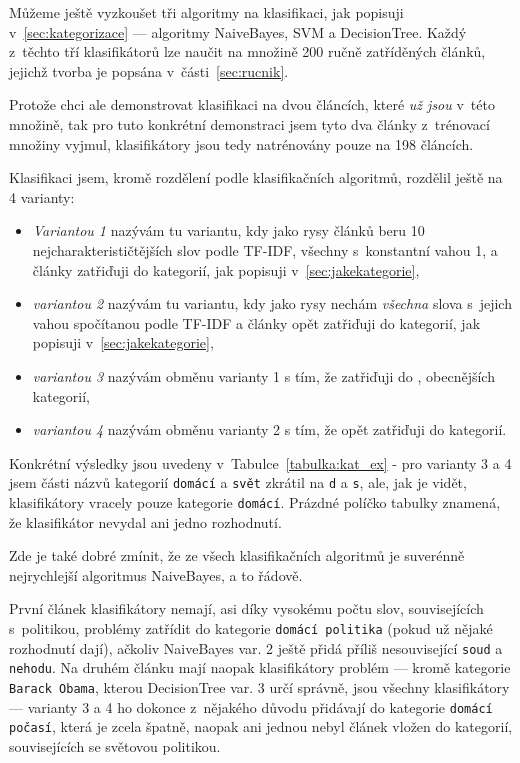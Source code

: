 \documentclass[12pt,a4paper]{report}
\begin{document}
%

Můžeme ještě vyzkoušet tři algoritmy na klasifikaci, jak popisuji v~\ref{sec:kategorizace} --- algoritmy NaiveBayes, SVM a DecisionTree. Každý z~těchto tří klasifikátorů lze naučit na množině 200 ručně zatříděných článků, jejichž tvorba je popsána v~části~\ref{sec:rucnik}.

Protože chci ale demonstrovat klasifikaci na dvou článcích, které \emph{už jsou} v~této množině, tak pro tuto konkrétní demonstraci jsem tyto dva články z~trénovací množiny vyjmul, klasifikátory jsou tedy natrénovány pouze na 198 článcích.

Klasifikaci jsem, kromě rozdělení podle klasifikačních algoritmů, rozdělil ještě na 4 varianty:

\begin{itemize}
    \item \emph{Variantou 1} nazývám tu variantu, kdy jako rysy článků beru 10 nej\-cha\-rak\-te\-ri\-sti\-čtěj\-ších slov podle TF-IDF, všechny s~konstantní vahou 1, a články zatřiďuji do  kategorií, jak popisuji v~\ref{sec:jakekategorie},
    \item \emph{variantou 2} nazývám tu variantu, kdy jako rysy nechám \emph{všechna} slova s~jejich vahou spočítanou podle TF-IDF  a články opět zatřiďuji do  kategorií, jak popisuji v~\ref{sec:jakekategorie},
    \item \emph{variantou 3} nazývám obměnu varianty 1 s tím, že zatřiďuji do , obecnějších kategorií,
    \item \emph{variantou 4} nazývám obměnu varianty 2 s tím, že opět zatřiďuji do  kategorií.
\end{itemize}


Konkrétní výsledky jsou uvedeny v~Tabulce~\ref{tabulka:kat_ex} - pro varianty 3 a 4 jsem části názvů kategorií \texttt{domácí} a \texttt{svět} zkrátil na \texttt{d} a \texttt{s}, ale, jak je vidět, klasifikátory vracely pouze kategorie \texttt{domácí}. Prázdné políčko tabulky znamená, že klasifikátor nevydal ani jedno rozhodnutí. 

Zde je také dobré zmínit, že ze všech klasifikačních algoritmů je suverénně nejrychlejší algoritmus NaiveBayes, a to řádově.

První článek klasifikátory nemají, asi díky vysokému počtu slov, souvisejících s~politikou, problémy zatřídit do kategorie \texttt{domácí politika} (pokud už nějaké rozhodnutí dají), ačkoliv NaiveBayes var. 2 ještě přidá příliš nesouvisející \texttt{soud} a \texttt{nehodu}. Na druhém článku mají naopak klasifikátory problém --- kromě kategorie \texttt{Barack Obama}, kterou DecisionTree var. 3 určí správně, jsou všechny klasifikátory  --- varianty 3 a 4 ho dokonce z~nějakého důvodu přidávají do kategorie \texttt{domácí počasí}, která je zcela špatně, naopak ani jednou nebyl článek vložen do kategorií, souvisejících se světovou politikou.
\end{document}
